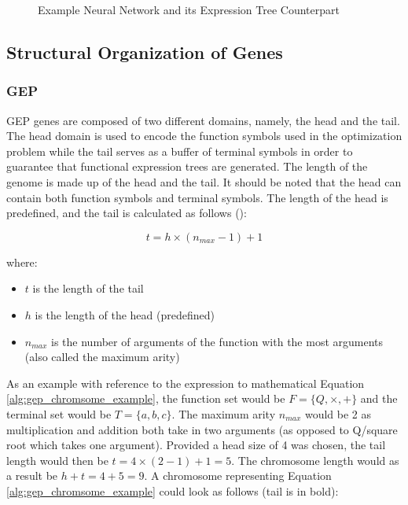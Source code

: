 \begin{figure}[H] %
	\centering %
	\caption{Example Neural Network and its Expression Tree Counterpart}
	\label{fig:gep_nn_example} %
\end{figure}

\subsection{Structural Organization of Genes}
\subsubsection{GEP}
GEP genes are composed of two different domains, namely, the head and the tail. The head domain is used to encode the function symbols used in the optimization problem while the tail serves as a buffer of terminal symbols in order to guarantee that functional expression trees are generated. The length of the genome is made up of the head and the tail. It should be noted that the head can contain both function symbols and terminal symbols. The length of the head is predefined, and the tail is calculated as follows (\cite{ferreira2006gene}):

\begin{equation}\label{alg:prefix}
    t = h \times (n_{max} - 1) + 1
\end{equation}

\noindent where:
\begin{itemize}
    \item \textbf{$t$} is the length of the tail
    \item \textbf{$h$} is the length of the head (predefined)
    \item \textbf{$n_{max}$} is the number of arguments of the function with the most arguments (also called the maximum arity)
\end{itemize}

\noindent As an example with reference to the expression to mathematical Equation \ref{alg:gep_chromsome_example}, the function set would be $F=\{Q,\times,+\}$ and the terminal set would be $T=\{a,b,c\}$. The maximum arity $n_{max}$ would be 2 as multiplication and addition both take in two arguments (as opposed to Q/square root which takes one argument). Provided a head size of 4 was chosen, the tail length would then be $t = 4 \times (2 - 1) + 1 = 5$. The chromosome length would as a result be $h + t = 4 + 5 = 9$. A chromosome representing Equation \ref{alg:gep_chromsome_example} could look as follows (tail is in bold):


